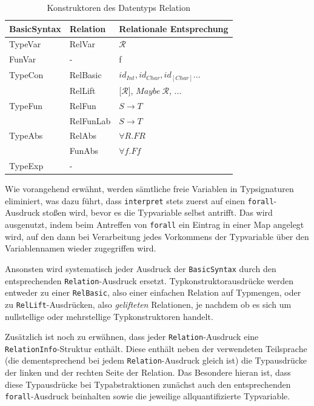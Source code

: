 \begin{table}
\centering
\begin{tabular}{| l | l | l |}
\hline
BasicSyntax & Relation & Relationale Entsprechung\\
\hline
TypeVar & RelVar & $\mathcal{R}$ \\
FunVar & - & f \\
TypeCon & RelBasic & $id_{Int}, id_{Char}, id_{[Char]}...$ \\
& RelLift & [$\mathcal{R}$], $Maybe\ \mathcal{R}$, ... \\
TypeFun & RelFun & $S \rightarrow T$ \\
& RelFunLab & $S \rightarrow T$ \\
TypeAbs & RelAbs & $\forall R . F R$ \\
& FunAbs &$\forall f . F f$\\
TypeExp & - &\\
\hline
\end{tabular}
\caption{Konstruktoren des Datentyps Relation}
\label{tab:relations}
\end{table}

Wie vorangehend erwähnt, werden sämtliche freie Variablen in Typsignaturen eliminiert, was dazu führt, dass \texttt{interpret}
stets zuerst auf einen \texttt{forall}-Ausdruck stoßen wird, bevor es die Typvariable selbst antrifft. Das wird ausgenutzt, indem
beim Antreffen von \texttt{forall} ein Eintrag in einer Map angelegt wird, auf den dann bei Verarbeitung jedes Vorkommens der
Typvariable über den Variablennamen wieder zugegriffen wird.

Ansonsten wird systematisch jeder Ausdruck der \texttt{BasicSyntax} durch den entsprechenden \texttt{Relation}-Ausdruck
ersetzt. Typkonstruktorausdrücke werden entweder zu einer \texttt{RelBasic}, also einer einfachen Relation auf Typmengen,
oder zu \texttt{RelLift}-Ausdrücken, also \textit{gelifteten} Relationen, je nachdem ob es sich um nullstellige oder mehrstellige
Typkonstruktoren handelt.

Zusätzlich ist noch zu erwähnen, dass jeder \texttt{Relation}-Ausdruck eine \texttt{RelationInfo}-Struktur enthält. Diese enthält
neben der verwendeten Teilsprache (die dementsprechend bei jedem \texttt{Relation}-Ausdruck gleich ist) die Typausdrücke
der linken und der rechten Seite der Relation. Das Besondere hieran ist, dass diese Typausdrücke bei Typabstraktionen zunächst
auch den entsprechenden \texttt{forall}-Ausdruck beinhalten sowie die jeweilige allquantifizierte Typvariable.

